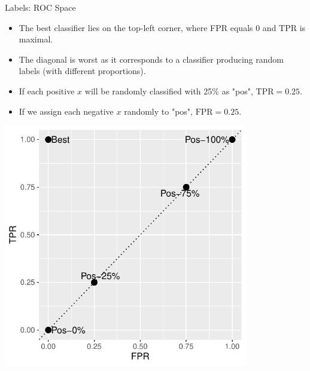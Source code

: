 
\begin{vbframe}{Labels: ROC Space}

\begin{itemize}
  \item The best classifier lies on the top-left corner, where FPR equals 0 and 
  TPR is maximal.
  \item The diagonal is worst as it corresponds to a classifier producing random 
  labels (with different proportions). 
\end{itemize}

\lz

\begin{minipage}[c]{0.5\textwidth}
  \begin{itemize}
    \item If each positive $x$ will be randomly classified 
    with 25\% as "pos", $\text{TPR} = 0.25$.
    \item If we assign each negative $x$ randomly to "pos", $\text{FPR} = 0.25$.
  \end{itemize}
\end{minipage}%
\begin{minipage}[c]{0.5\textwidth}
  \centering \includegraphics[width=0.8\textwidth]{figure/eval_mclass_roc_sp_2}
\end{minipage}

\end{vbframe}


